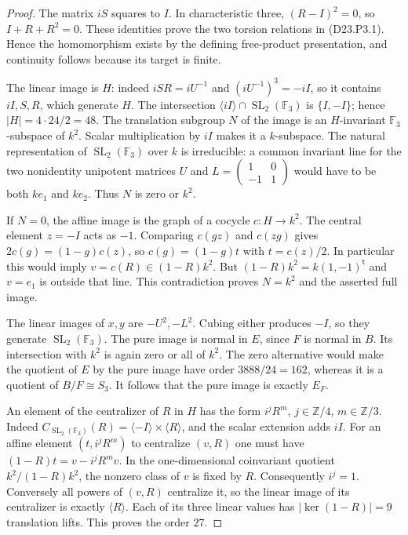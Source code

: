 \begin{proof}
The matrix $iS$ squares to $I$. In characteristic three,
$(R-I)^2=0$, so $I+R+R^2=0$. These identities prove the two
torsion relations in (D23.P3.1). Hence the homomorphism exists
by the defining free-product presentation, and continuity follows
because its target is finite.

The linear image is $H$: indeed $iSR=iU^{-1}$ and
$(iU^{-1})^3=-iI$, so it contains $iI,S,R$, which generate $H$.
The intersection $\langle iI\rangle\cap\operatorname{SL}_2(\mathbb F_3)$
is $\{I,-I\}$; hence $|H|=4\cdot24/2=48$.
The translation subgroup $N$ of the image is an $H$-invariant
$\mathbb F_3$-subspace of $k^2$. Scalar multiplication by $iI$
makes it a $k$-subspace. The natural representation of
$\operatorname{SL}_2(\mathbb F_3)$ over $k$ is irreducible:
a common invariant line for the two nonidentity unipotent
matrices $U$ and $L=\left(\begin{smallmatrix}1&0\\-1&1\end{smallmatrix}\right)$
would have to be both $ke_1$ and $ke_2$. Thus $N$ is zero or $k^2$.

If $N=0$, the affine image is the graph of a cocycle $c:H\to k^2$.
The central element $z=-I$ acts as $-1$. Comparing $c(gz)$ and
$c(zg)$ gives $2c(g)=(1-g)c(z)$, so
$c(g)=(1-g)t$ with $t=c(z)/2$. In particular this would imply
$v=c(R)\in(1-R)k^2$. But $(1-R)k^2=k(1,-1)^{\mathsf t}$
and $v=e_1$ is outside that line. This contradiction proves
$N=k^2$ and the asserted full image.

The linear images of $x,y$ are $-U^2,-L^2$. Cubing either
produces $-I$, so they generate $\operatorname{SL}_2(\mathbb F_3)$.
The pure image is normal in $E$, since $F$ is normal in $B$.
Its intersection with $k^2$ is again zero or all of $k^2$.
The zero alternative would make the quotient of $E$ by the pure
image have order $3888/24=162$, whereas it is a quotient of
$B/F\cong S_3$. It follows that the pure image is exactly $E_F$.

An element of the centralizer of $R$ in $H$ has the form
$i^jR^m$, $j\in\mathbb Z/4$, $m\in\mathbb Z/3$.
Indeed $C_{\operatorname{SL}_2(\mathbb F_3)}(R)
=\langle-I\rangle\times\langle R\rangle$, and the scalar
extension adds $iI$. For an affine element $(t,i^jR^m)$ to
centralize $(v,R)$ one must have
$(1-R)t=v-i^jR^m v$. In the one-dimensional coinvariant quotient
$k^2/(1-R)k^2$, the nonzero class of $v$ is fixed by $R$.
Consequently $i^j=1$. Conversely all powers of $(v,R)$ centralize
it, so the linear image of its centralizer is exactly
$\langle R\rangle$. Each of its three linear values has
$|\ker(1-R)|=9$ translation lifts. This proves the order $27$.


\end{proof}
